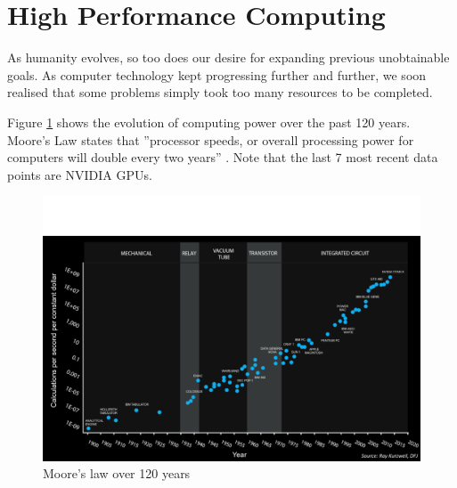 \documentclass[12pt]{book}
\begin{document}
\section{High Performance Computing}
As humanity evolves, so too does our desire for expanding previous unobtainable goals. As computer technology kept progressing further and further, we soon realised that some problems simply took too many resources to be completed.\par
Figure \ref{fig:moore} shows the evolution of computing power over the past 120 years. Moore's Law states that ''processor speeds, or overall processing power for computers will double every two years'' \cite{moore}. Note that the last 7 most recent data points are NVIDIA GPUs.

\begin{figure}[H]
\centering
  \includegraphics[width=0.6\linewidth]{Resources/Images/moore120.png}
  \caption{Moore's law over 120 years}
  \label{fig:moore}
\end{figure}
\end{document}
